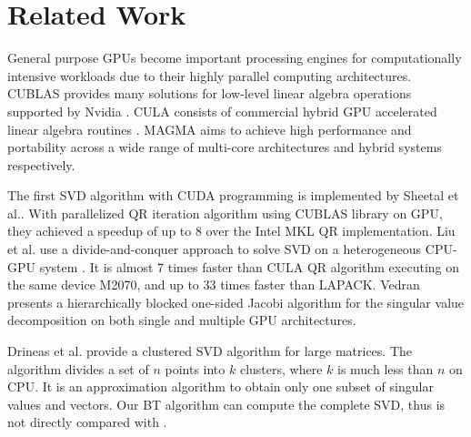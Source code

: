 \vspace{-0.4in}
\section{Related Work} \label{sec:related}
\vspace{-0.1in}
General purpose GPUs become important processing engines for computationally intensive workloads due to their highly parallel computing architectures.
CUBLAS provides many solutions for low-level linear algebra operations supported by Nvidia \cite{cublas}. 
CULA consists of commercial hybrid GPU accelerated linear algebra routines \cite{cula}.
MAGMA aims to achieve high performance and portability across a wide range of multi-core architectures and hybrid systems respectively\cite{magma}.


The first SVD algorithm with CUDA programming is implemented by Sheetal et al.\cite{09IPDPSQR}. With parallelized QR iteration algorithm using CUBLAS library on GPU, they achieved a speedup of up to 8 over the Intel MKL QR implementation.
Liu et al. use a divide-and-conquer approach to solve SVD on a heterogeneous CPU-GPU system \cite{13CFDC}.
It is almost 7 times faster than CULA QR algorithm executing on the same device M2070, and up to 33 times faster than LAPACK.
Vedran\cite{14arxivjacobi} presents a hierarchically blocked one-sided Jacobi algorithm for the singular value decomposition on both single and multiple GPU architectures. 

Drineas et al. \cite{99clustering} provide a clustered SVD algorithm for large matrices. The algorithm divides a set of $n$ points into $k$ clusters, where $k$ is much less than $n$ on CPU.
It is an approximation algorithm to obtain only one subset of singular values
and vectors. Our BT algorithm can compute the complete SVD, thus is not
directly compared with \cite{99clustering}. 


